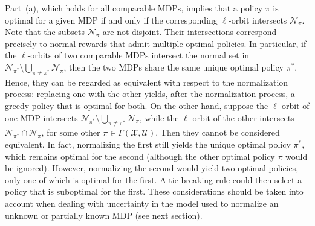 \documentclass[10pt,leqno]{amsart}
\newcommand{\U}{\mathcal{U}}
\newcommand{\X}{\mathcal{X}}
\newcommand{\policy}{\pi}
\newcommand{\Sect}{\Gamma(\X, \U)}
\newcommand{\actAdvsym}{\ell}
\newcommand{\normset}{\mathcal{N}}
\begin{document}
\hspace{0.3cm}Part~(a), which holds for all comparable MDPs, implies that a policy $\policy$ is optimal for a given MDP if and only if the corresponding $\actAdvsym$-orbit intersects $\normset_\policy$. Note that the subsets $\normset_\policy$ are not disjoint. Their intersections correspond precisely to normal rewards that admit multiple optimal policies. In particular, if the $\actAdvsym$-orbits of two comparable MDPs intersect the normal set in $\normset_{\policy^*} \setminus \bigcup_{\policy \neq \policy^*} \normset_{\policy}$, then the two MDPs share the same unique optimal policy $\policy^*$. Hence, they can be regarded as equivalent with respect to the normalization process: replacing one with the other yields, after the normalization process, a greedy policy that is optimal for both. On the other hand, suppose the $\actAdvsym$-orbit of one MDP intersects $\normset_{\policy^*} \setminus \bigcup_{\policy \neq \policy^*} \normset_{\policy}$, while the $\actAdvsym$-orbit of the other intersects $\normset_{\policy^*} \cap \normset_{\policy}$, for some other $\policy \in \Sect$. Then they cannot be considered equivalent. In fact, normalizing the first still yields the unique optimal policy $\policy^*$, which remains optimal for the second (although the other optimal policy $\policy$ would be ignored). However, normalizing the second would yield two optimal policies, only one of which is optimal for the first. A tie-breaking rule could then select a policy that is suboptimal for the first. These considerations should be taken into account when dealing with uncertainty in the model used to normalize an unknown or partially known MDP (see next section). 
\end{document}
